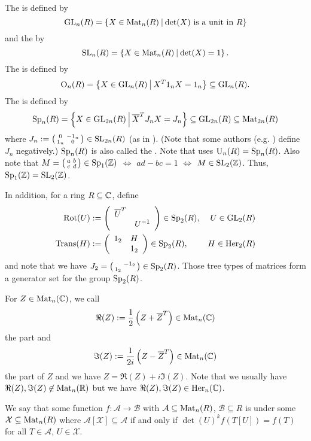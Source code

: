The  is defined by
\[ \GL_n(R) = \Set{X \in \M_n(R)}{\text{$\det(X)$ is a unit in $R$}} \]
and the  by
\[ \SL_n(R) = \Set{X \in \M_n(R)}{\det(X) = 1} . \] %
The  is defined by
\[ \Orth_n(R) = \Set{X \in \GL_n(R)}{X^T 1_n X = 1_n} \subseteq \GL_n(R) . \] %
The  is defined by
\[ \Sp_n(R) = \Set{X \in \GL_{2n}(R)}{\overline{X}^T J_n X = J_n} \subseteq \GL_{2n}(R) \subseteq \M_{2n}(R) \] %
where $J_n := \left( \begin{smallmatrix} 0 & -1_n \\ 1_n & 0 \end{smallmatrix} \right) \in \operatorname{SL}_{2n}(R)$ (as in \cite{Dern01Herm}). (Note that some authors (e.g. \cite{PoorYuen07Comp}) define $J_n$ negatively.)
$\operatorname{Sp}_n(R)$ is also called the . Note that \cite{Dern01Herm} uses $\operatorname{U}_n(R) = \operatorname{Sp}_n(R)$.
Also note that $M = \left( \begin{smallmatrix} a & b \\ c & d \end{smallmatrix} \right) \in \operatorname{Sp}_1(\mathbb{Z})$ $\Leftrightarrow$ $ad - bc = 1$ $\Leftrightarrow$ $M \in \operatorname{SL}_2(\mathbb{Z})$. Thus, $\operatorname{Sp}_1(\mathbb{Z}) = \operatorname{SL}_2(\mathbb{Z})$. %

In addition, for a ring $R \subseteq \mathbb{C}$, define
\begin{align*}
\operatorname{Rot}(U) & := \left( \begin{array}{cc} \overline{U}^T &  \\  & U^{-1} \end{array} \right) \in \operatorname{Sp}_2(R), & U \in \operatorname{GL}_2(R) \\
\operatorname{Trans}(H) & := \left( \begin{array}{cc} 1_2 & H \\  & 1_2 \end{array} \right) \in \operatorname{Sp}_2(R),  & H \in \operatorname{Her}_2(R)
\end{align*}
and note that we have $J_2 = \left( \begin{smallmatrix}  & -1_2 \\ 1_2 &  \end{smallmatrix} \right) \in \operatorname{Sp}_2(R)$. Those tree types of matrices form a generator set for the group $\operatorname{Sp}_2(R)$.

For $Z \in \operatorname{Mat}_n(\mathbb{C})$, we call
\[ \Re(Z) := \frac{1}{2} \left(Z + \overline{Z}^{T}\right) \in \operatorname{Mat}_n(\mathbb{C}) \]
the  part and
\[ \Im(Z) := \frac{1}{2i} \left(Z - \overline{Z}^{T}\right)  \in \operatorname{Mat}_n(\mathbb{C}) \]
the  part of $Z$ and we have $Z = \Re(Z) + i \Im(Z)$.
Note that we usually have $\Re(Z),\Im(Z) \not\in \operatorname{Mat}_n(\mathbb{R})$ but we have $\Re(Z),\Im(Z) \in \operatorname{Her}_n(\mathbb{C})$.

We say that some function $f \colon \mathcal{A} \rightarrow \mathcal{B}$ with $\mathcal{A} \subseteq \operatorname{Mat}_n(R)$, $\mathcal{B} \subseteq R$ is  under some $\mathcal{X} \subseteq \operatorname{Mat}_n(R)$ where $\mathcal{A}[\mathcal{X}] \subseteq \mathcal{A}$ if and only if $\det(U)^k f(T[U]) = f(T)$ for all $T \in \mathcal{A}$, $U \in \mathcal{X}$.

